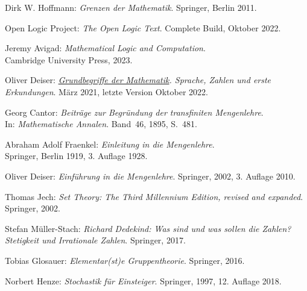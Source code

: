 \begin{thebibliography}{00}
Dirk W. Hoffmann: \emph{Grenzen der Mathematik}.
Springer, Berlin 2011.

 Open Logic Project:
\emph{The Open Logic Text}. Complete Build, Oktober 2022.

 Jeremy Avigad:
\emph{Mathematical Logic and Computation}.\\
Cambridge University Press, 2023.

Oliver Deiser:
\emph{\href{https://www.aleph1.info/?call=Puc&permalink=grundbegriffe}%
{Grundbegriffe der Mathematik}. Sprache, Zahlen und erste
Erkundungen}. März 2021, letzte Version Oktober 2022.

 Georg Cantor:
\emph{Beiträge zur Begründung der transfiniten Mengenlehre}.\\
In: \emph{Mathematische Annalen}. Band~46, 1895, S.~481.

 Abraham Adolf Fraenkel:
\emph{Einleitung in die Mengenlehre}.\\
Springer, Berlin 1919, 3. Auflage 1928.

 Oliver Deiser:
\emph{Einführung in die Mengenlehre}.
Springer, 2002, 3. Auflage 2010.

 Thomas Jech: \emph{Set Theory: The Third Millennium
Edition, revised and expanded}. Springer, 2002.

 Stefan Müller-Stach:
\emph{Richard Dedekind: Was sind und was sollen die Zahlen?
Stetigkeit und Irrationale Zahlen}. Springer, 2017.

 Tobias Glosauer:
\emph{Elementar(st)e Gruppentheorie}.
Springer, 2016.

 Norbert Henze: \emph{Stochastik für Einsteiger}.
Springer, 1997, 12. Auflage 2018.
\end{thebibliography}
